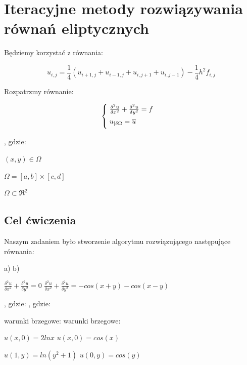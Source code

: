 \section{Iteracyjne metody rozwiązywania równań eliptycznych}

Będziemy korzystać z równania:

$$u_{i,j} = \frac{1}{4}(u_{i+1,j} + u_{i-1,j} + u_{i,j+1} + u_{i,j-1}) - \frac{1}{4}h^2f_{i,j}$$

\vspace{0.5cm}

Rozpatrzmy równanie:

\[
\begin{cases}
\vspace{0.1cm} 
\hspace{0,1cm}\frac{\delta^2 u}{\delta x^2} + \frac{\delta^2 u}{\delta y^2} = f\\
\vspace{0.1cm}
\hspace{0,1cm}u_{|\delta \Omega} = \overline{u} \\
\end{cases}
\]

, gdzie:

$(x,y) \in \Omega$

$\Omega = [a,b] \times [c,d]$

$\Omega \subset \Re^2$

\subsection{Cel ćwiczenia}

Naszym zadaniem było stworzenie algorytmu rozwiązującego następujące równania:

a) \hspace{6cm} b)

$\frac{\delta^2 u}{\delta x^2} + \frac{\delta^2 u}{\delta y^2} = 0$ \hspace{4.15cm} $\frac{\delta^2 u}{\delta x^2} + \frac{\delta^2 u}{\delta y^2} = -cos(x+y)-cos(x-y)$

, gdzie: \hspace{5.2cm} , gdzie:

warunki brzegowe: \hspace{3.5cm} warunki brzegowe:

$u(x,0) = 2lnx$ \hspace{4.15cm} $u(x,0) = cos(x)$

$u(1,y) = ln(y^2 + 1)$ \hspace{3.3cm} $u(0,y) = cos(y)$

